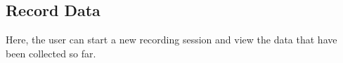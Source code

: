 \subsection{Record Data}

\begin{minipage}{0.3\textwidth}
Here, the user can start a new recording session and view the data that have been collected so far.
\end{minipage} \hfill
\begin{minipage}{0.3\textwidth}
\end{minipage}
\begin{minipage}{0.3\textwidth}
\end{minipage}


